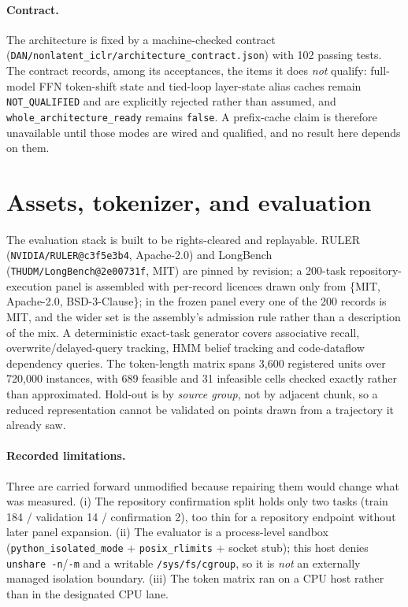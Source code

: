 \documentclass[11pt]{article}
\begin{document}
\paragraph{Contract.} The architecture is fixed by a machine-checked contract
(\texttt{DAN/nonlatent\_iclr/architecture\_contract.json}) with 102 passing tests. The
contract records, among its acceptances, the items it does \emph{not} qualify: full-model
FFN token-shift state and tied-loop layer-state alias caches remain
\texttt{NOT\_QUALIFIED} and are explicitly rejected rather than assumed, and
\texttt{whole\_architecture\_ready} remains \texttt{false}. A prefix-cache claim is
therefore unavailable until those modes are wired and qualified, and no result here
depends on them.

\section{Assets, tokenizer, and evaluation}

The evaluation stack is built to be rights-cleared and replayable. RULER
(\texttt{NVIDIA/RULER@c3f5e3b4}, Apache-2.0) and LongBench
(\texttt{THUDM/LongBench@2e00731f}, MIT) are pinned by revision; a 200-task
repository-execution panel is assembled with per-record licences drawn only from
\{MIT, Apache-2.0, BSD-3-Clause\}; in the frozen panel every one of the 200 records is
MIT, and the wider set is the assembly's admission rule rather than a description of the
mix. A deterministic exact-task generator covers associative recall,
overwrite/delayed-query tracking, HMM belief tracking and code-dataflow dependency
queries. The token-length matrix spans 3{,}600 registered units over 720{,}000
instances, with 689 feasible and 31 infeasible cells checked exactly rather than
approximated. Hold-out is by \emph{source group}, not by adjacent chunk, so a reduced
representation cannot be validated on points drawn from a trajectory it already saw.

\paragraph{Recorded limitations.} Three are carried forward unmodified because repairing
them would change what was measured. (i) The repository confirmation split holds only
two tasks (train 184 / validation 14 / confirmation 2), too thin for a repository
endpoint without later panel expansion. (ii) The evaluator is a process-level sandbox
(\texttt{python\_isolated\_mode} + \texttt{posix\_rlimits} + socket stub); this host
denies \texttt{unshare -n}/\texttt{-m} and a writable \texttt{/sys/fs/cgroup}, so it is
\emph{not} an externally managed isolation boundary. (iii) The token matrix ran on a CPU
host rather than in the designated CPU lane.
\end{document}

